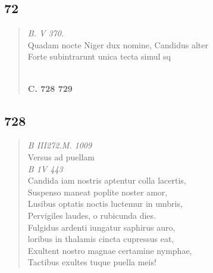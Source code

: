 \documentclass[11pt, a4paper]{report}
\begin{document}
            \subsection*{72}
      \begin{verse}
      \textit{B. V 370.} \\  \lbrack Quadam nocte Niger dux nomine, Candidus alter \\ Forte subintrarunt unica tecta simul sq \rbrack  \\ 
        ﻿\pagebreak 
    \begin{center} \textbf{C. 728 729} \end{center} \marginpar{[215]} 
      \end{verse}
  
            \subsection*{728}
      \begin{verse}
      \textit{B III272.M. 1009} \\ Versus ad puellam \\ \textit{B 1V 443} \\ Candida iam nostris aptentur colla lacertis, \\ Suspenso maneat poplite noster amor, \\ Lusibus optatis noctis luctemur in umbris, \\ Pervigiles laudes, o rubicunda dies. \\ Fulgidus ardenti iungatur saphirus auro, \\ loribus in thalamis cincta cupressus eat, \\ Exultent nostro magnae certamine nymphae, \\ Tactibus exultes tuque puella meis! \\ 
      \end{verse}
  
\end{document}

